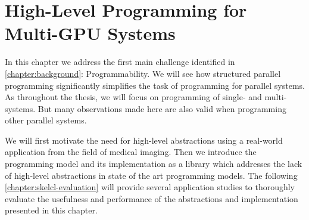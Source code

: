 
\chapter{High-Level Programming for Multi-GPU Systems}

\label{chapter:skelcl}

In this chapter we address the first main challenge identified in \autoref{chapter:background}: Programmability.
We will see how structured parallel programming significantly simplifies the task of programming for parallel systems.
As throughout the thesis, we will focus on programming of single- and multi-\GPU systems.
But many observations made here are also valid when programming other parallel systems.

We will first motivate the need for high-level abstractions using a real-world \OpenCL application from the field of medical imaging.
Then we introduce the \emph{\SkelCL} programming model and its implementation as a \Cpp library which addresses the lack of high-level abstractions in state of the art \GPU programming models.
The following \autoref{chapter:skelcl-evaluation} will provide several application studies to thoroughly evaluate the usefulness and performance of the abstractions and implementation presented in this chapter.
































































